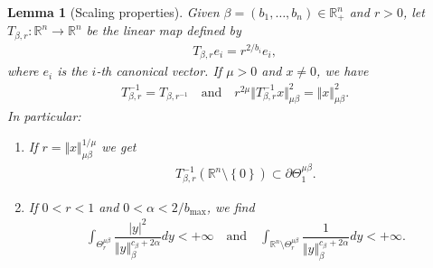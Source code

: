 \documentclass[10pt, leqno]{article}
\newtheorem{lemma}[theorem]{Lemma}
\theoremstyle{definition}
\theoremstyle{remark}
\numberwithin{equation}{section}
\begin{document}
\begin{lemma}[Scaling properties]
\label{scaling properties lemma}
Given $\beta=(b_{1}, \dots, b_{n}) \in \mathbb{R}^{n}_{+}$ and $r>0$, let $T_{\beta,r}: \mathbb{R}^{n} \rightarrow \mathbb{R}^{n}$ be the linear map defined by
\begin{eqnarray}
T_{\beta,r}e_{i} = r^{2/b_{i}}e_{i},
\end{eqnarray}
where $e_{i}$ is the $i$-th canonical vector. If $\mu > 0$ and $x \neq 0$, we have
\begin{eqnarray}
T^{-1}_{\beta,r} = T^{}_{\beta,r^{-1}} \quad \text{and} \quad r^{2\mu}\Vert T^{-1}_{\beta,r} x \Vert^{2}_{\mu \beta} = \Vert x \Vert^{2}_{\mu \beta}.
\end{eqnarray}
In particular:
\begin{enumerate}
\item If $r = \Vert x \Vert_{\mu \beta}^{1/\mu}$ we get
 \begin{eqnarray}
\label{anisotropic inversion}
T^{-1}_{\beta,r}\left( \mathbb{R}^{n} \setminus \left\lbrace 0 \right\rbrace \right) \subset \partial \Theta^{\mu \beta}_{1}.
\end{eqnarray}
\item If $0 < r < 1$ and $0 < \alpha < 2/ b_{\max}$, we find
\begin{eqnarray}
\label{equivalence between norms on anisotropic sphere 2}
\int_{\Theta^{\mu \beta}_{r}} \dfrac{\vert y \vert^{2}}{\Vert y \Vert_{\beta}^{c_{\beta}+2\alpha}} dy < +\infty \quad \text{and} \quad \int_{\mathbb{R}^{n} \setminus \Theta^{\mu \beta}_{r}} \dfrac{1}{\Vert y \Vert_{\beta_{}}^{c_{\beta_{}}+2\alpha}} dy < +\infty.
\end{eqnarray}
\end{enumerate}
\end{lemma}
\end{document}
